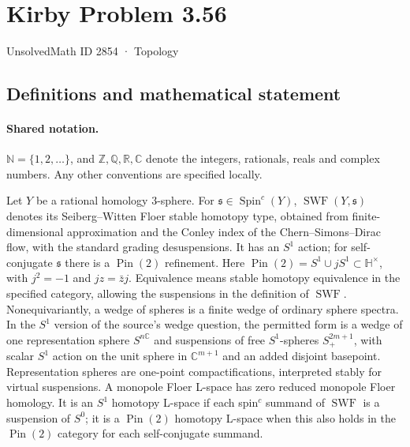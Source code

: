 \documentclass[11pt]{article}
\begin{document}
\setcounter{section}{2853}
\section{Kirby Problem 3.56}\label{2854}
{\small\sffamily UnsolvedMath ID 2854 · Topology}
\subsection{Definitions and mathematical statement}

\paragraph{Shared notation.}$\mathbb N=\{1,2,\ldots\}$, and $\mathbb Z,\mathbb Q,\mathbb R,\mathbb C$ denote the integers, rationals, reals and complex numbers. Any other conventions are specified locally.


Let $Y$ be a rational homology $3$-sphere. For $\mathfrak s\in\operatorname{Spin}^c(Y)$, $\operatorname{SWF}(Y,\mathfrak s)$ denotes its Seiberg--Witten Floer stable homotopy type, obtained from finite-dimensional approximation and the Conley index of the Chern--Simons--Dirac flow, with the standard grading desuspensions. It has an $S^1$ action; for self-conjugate $\mathfrak s$ there is a $\operatorname{Pin}(2)$ refinement. Here $\operatorname{Pin}(2)=S^1\cup jS^1\subset\mathbb H^\times$, with $j^2=-1$ and $jz=\bar z j$.
Equivalence means stable homotopy equivalence in the specified category, allowing the suspensions in the definition of $\operatorname{SWF}$. Nonequivariantly, a wedge of spheres is a finite wedge of ordinary sphere spectra. In the $S^1$ version of the source's wedge question, the permitted form is a wedge of one representation sphere $S^{n\mathbb C}$ and suspensions of free $S^1$-spheres $S^{2m+1}_+$, with scalar $S^1$ action on the unit sphere in $\mathbb C^{m+1}$ and an added disjoint basepoint. Representation spheres are one-point compactifications, interpreted stably for virtual suspensions.
A monopole Floer L-space has zero reduced monopole Floer homology. It is an $S^1$ homotopy L-space if each spin$^c$ summand of $\operatorname{SWF}$ is a suspension of $S^0$; it is a $\operatorname{Pin}(2)$ homotopy L-space when this also holds in the $\operatorname{Pin}(2)$ category for each self-conjugate summand.
\end{document}
